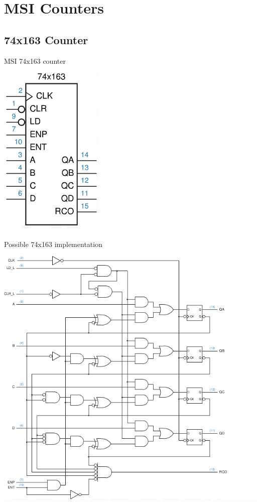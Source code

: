 \section{MSI Counters}
\subsection{74x163 Counter}

\begin{frame}{MSI 74x163 counter}
  \begin{center}
    \includegraphics[scale=0.5]{74x163Schematic}
  \end{center}
\end{frame}

\begin{frame}{Possible 74x163 implementation}
  \begin{center}
    \includegraphics[scale=0.3]{Wakerly_Figure_8_28}
  \end{center}
\end{frame}

